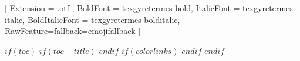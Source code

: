 \usepackage{booktabs,tabu}
\usepackage{xcolor,colortbl}

\usepackage[automark,headsepline,footsepline]{scrlayer-scrpage}
\clearpairofpagestyles
\cfoot[\pagemark]{\pagemark}
\lehead{\headmark}
\rohead{\headmark}
\pagestyle{scrheadings}

\renewcommand*{\chapterformat}{%
\mbox{\chapappifchapterprefix{\nobreakspace}%
\scalebox{3}{\color{gray}\thechapter}\enskip}}

\usepackage{fontspec}

\setmainfont{texgyretermes-regular}[
  Extension      = .otf ,
  BoldFont       = texgyretermes-bold,
  ItalicFont     = texgyretermes-italic,
  BoldItalicFont = texgyretermes-bolditalic,
  RawFeature={fallback=emojifallback}
]

\usepackage{eso-pic}
  \usepackage{graphicx}
$if(toc)$
$if(toc-title)$
\renewcommand*\contentsname{$toc-title$}
$endif$
$if(colorlinks)$
\hypersetup{linkcolor=$if(toccolor)$$toccolor$$else$$endif$}
$endif$
\setcounter{tocdepth}{$toc-depth$}
$endif$

\newcommand*{\myAuthor}{$for(authors)$$it.name.literal$$sep$ \& $endfor$}


